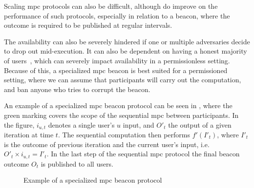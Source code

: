 Scaling \gls{mpc} protocols can also be difficult, although  do improve on the performance of such protocols, especially in relation to a beacon, where the outcome is required to be published at regular intervals.

The availability can also be severely hindered if one or multiple adversaries decide to drop out mid-execution.
It can also be dependent on having a honest majority of users~\cite{cascudo2017scrape}, which can severely impact availability in a permissionless setting.
Because of this, a specialized \gls{mpc} beacon is best suited for a permissioned setting, where we can assume that participants will carry out the computation, and ban anyone who tries to corrupt the beacon.

An example of a specialized \gls{mpc} beacon protocol can be seen in , where the green marking covers the scope of the sequential \gls{mpc} between participants.
In the figure, $i_{u,t}$ denotes a single user's $u$ input, and $O'_t$ the output of a given iteration at time $t$.
The sequential computation then performs $f'(I'_t)$, where $I'_t$ is the outcome of previous iteration and the current user's input, i.e.\ $O'_t \times i_{u,t} = I'_t$.
In the last step of the sequential \gls{mpc} protocol the final beacon outcome $O_t$ is published to all users.

\begin{figure*}[hbt]
    \centering
    \footnotesize
    \caption{Example of a specialized \gls{mpc} beacon protocol}\label{fig:mpc_beacon}
\end{figure*}


